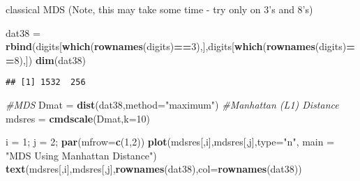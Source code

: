 \documentclass[
]{article}
\newenvironment{Shaded}{\begin{snugshade}}{\end{snugshade}}
\newcommand{\CommentTok}[1]{\textcolor[rgb]{0.56,0.35,0.01}{\textit{#1}}}
\newcommand{\DataTypeTok}[1]{\textcolor[rgb]{0.13,0.29,0.53}{#1}}
\newcommand{\DecValTok}[1]{\textcolor[rgb]{0.00,0.00,0.81}{#1}}
\newcommand{\KeywordTok}[1]{\textcolor[rgb]{0.13,0.29,0.53}{\textbf{#1}}}
\newcommand{\NormalTok}[1]{#1}
\newcommand{\OperatorTok}[1]{\textcolor[rgb]{0.81,0.36,0.00}{\textbf{#1}}}
\newcommand{\StringTok}[1]{\textcolor[rgb]{0.31,0.60,0.02}{#1}}
\begin{document}
classical MDS (Note, this may take some time - try only on 3's and 8's)

\begin{Shaded}
\begin{Highlighting}[]
\NormalTok{dat38 =}\StringTok{ }\KeywordTok{rbind}\NormalTok{(digits[}\KeywordTok{which}\NormalTok{(}\KeywordTok{rownames}\NormalTok{(digits)}\OperatorTok{==}\DecValTok{3}\NormalTok{),],digits[}\KeywordTok{which}\NormalTok{(}\KeywordTok{rownames}\NormalTok{(digits)}\OperatorTok{==}\DecValTok{8}\NormalTok{),])}
\KeywordTok{dim}\NormalTok{(dat38)}
\end{Highlighting}
\end{Shaded}

\begin{verbatim}
## [1] 1532  256
\end{verbatim}

\begin{Shaded}
\end{Shaded}

\begin{Shaded}
\begin{Highlighting}[]
\CommentTok{#MDS}
\NormalTok{Dmat =}\StringTok{ }\KeywordTok{dist}\NormalTok{(dat38,}\DataTypeTok{method=}\StringTok{"maximum"}\NormalTok{) }\CommentTok{#Manhattan (L1) Distance}
\NormalTok{mdsres =}\StringTok{ }\KeywordTok{cmdscale}\NormalTok{(Dmat,}\DataTypeTok{k=}\DecValTok{10}\NormalTok{)}

\NormalTok{i =}\StringTok{ }\DecValTok{1}\NormalTok{; j =}\StringTok{ }\DecValTok{2}\NormalTok{;}
\KeywordTok{par}\NormalTok{(}\DataTypeTok{mfrow=}\KeywordTok{c}\NormalTok{(}\DecValTok{1}\NormalTok{,}\DecValTok{2}\NormalTok{))}
\KeywordTok{plot}\NormalTok{(mdsres[,i],mdsres[,j],}\DataTypeTok{type=}\StringTok{"n"}\NormalTok{, }\DataTypeTok{main =} \StringTok{"MDS Using Manhattan Distance"}\NormalTok{)}
\KeywordTok{text}\NormalTok{(mdsres[,i],mdsres[,j],}\KeywordTok{rownames}\NormalTok{(dat38),}\DataTypeTok{col=}\KeywordTok{rownames}\NormalTok{(dat38))}
\end{Highlighting}
\end{Shaded}
\end{document}
